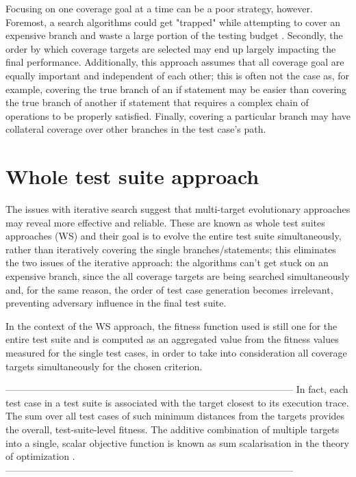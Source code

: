 Focusing on one coverage goal at a time can be a poor strategy, however. Foremost, a search algorithms could get "trapped" while attempting to cover an expensive branch and waste a large portion of the testing budget \cite{DBLP:journals/tse/FraserA13}.
Secondly, the order by which coverage targets are selected may end up largely impacting the final performance.
Additionally, this approach assumes that all coverage goal are equally important and independent of each other; this is often not the case as, for example, covering the true branch of an if statement may be easier than covering the true branch of another if statement that requires a complex chain of operations to be properly satisfied. Finally, covering a particular branch may have collateral coverage over other branches in the test case's path.


\section{Whole test suite approach}
The issues with iterative search suggest that multi-target evolutionary approaches may reveal more effective and reliable. These are known as whole test suites approaches (WS) \cite{QSIC11} and their goal is to evolve the entire test suite simultaneously, rather than iteratively covering the single branches/statements; this eliminates the two issues of the iterative approach: the algorithms can't get stuck on an expensive branch, since the all coverage targets are being searched simultaneously and, for the same reason, the order of test case generation becomes irrelevant, preventing adversary influence in the final test suite.


In the context of the WS approach, the fitness function used is still one for the entire test suite and is computed as an aggregated value from the fitness values measured for the single test cases, in order to take into consideration all coverage targets simultaneously for the chosen criterion.

------------------------------------------------------------------------------------------
In fact, each test case in a test suite
is associated with the target closest to its execution trace.
The sum over all test cases of such minimum distances
from the targets provides the overall, test-suite-level fitness.
The additive combination of multiple targets into a single,
scalar objective function is known as sum scalarisation in
the theory of optimization \cite{SearchMethodologies}.
------------------------------------------------------------------------------------------

